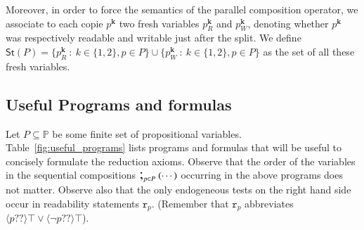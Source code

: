 \documentclass{llncs}
\newcommand{\cp}[2]{{#2}^\mathbf{#1}}
\newcommand{\cpr}[2]{\cp{#1}{#2}_R}
\newcommand{\cpw}[2]{\cp{#1}{#2}_W}
\newcommand{\readable}[1]{\mathtt{r}_{#1}}
\newcommand{\testendo}{?\!\!?}			%
\newcommand{\storeset}{\mathsf{St}}
\newcommand{\ldia}[1]{ \big\langle #1 \big\rangle}
\newcommand{\propset}{\mathbb P}
\newcommand{\seqseq}[1]{ \text{\Large ;}_{#1} ~ }
\newcommand{\set}[1]{\{#1\}}
\newcommand{\suchthat}{~ : ~}
\begin{document}
Moreover, in order to force the semantics of the parallel composition operator, we associate to each copie $\cp k p$ two fresh variables $\cpr k p$ and $\cpw k p$,
denoting whether $\cp k p$ was respectively readable and writable just after the split.
We define $\storeset(P) =
\set{ \cpr k p \suchthat k \in \set{1,2}, p \in P} \cup
\set{ \cpw k p \suchthat k \in \set{1,2}, p \in P}$ as the set of all these fresh variables.


\subsection{Useful Programs and formulas}\label{sec:usefulFml}

Let $P \subseteq \propset$ be some finite set of propositional variables. 
Table~\ref{fig:useful_programs} lists programs and formulas that will be useful to concisely formulate the reduction axioms.
%
Observe that the order of the variables in the sequential compositions $ \seqseq{p \in P} ( \cdots ) $ occurring in the above programs does not matter. 
Observe also that the only endogeneous tests on the right hand side occur in readability statements $\readable p$. 
(Remember that $\readable p$ abbreviates $\ldia{ p \testendo} \top \lor \ldia{ \lnot p \testendo} \top $). 
\end{document}
